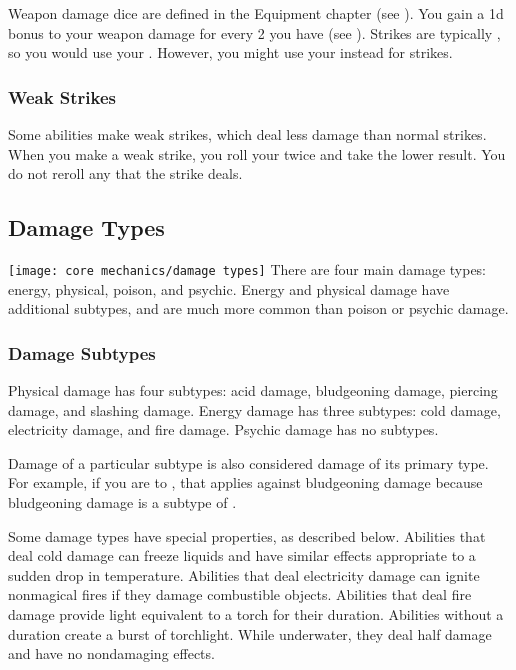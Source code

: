         Weapon damage dice are defined in the Equipment chapter (see ).
        You gain a \plus1d bonus to your weapon damage for every 2  you have (see ).
        Strikes are typically , so you would use your .
        However, you might use your  instead for \magical strikes.

        \subsubsection{Weak Strikes}
            Some abilities make weak strikes, which deal less damage than normal strikes.
            When you make a weak strike, you roll your  twice and take the lower result.
            You do not reroll any  that the strike deals.

    \subsection{Damage Types}\label{Damage Types}
        \texttt{[image: core mechanics/damage types]}
        There are four main damage types: energy, physical, poison, and psychic.
        Energy and physical damage have additional subtypes, and are much more common than poison or psychic damage.

        \subsubsection{Damage Subtypes}\label{Damage Subtypes}
            Physical damage has four subtypes: acid damage, bludgeoning damage, piercing damage, and slashing damage.
            Energy damage has three subtypes: cold damage, electricity damage, and fire damage.
            Psychic damage has no subtypes.

            Damage of a particular subtype is also considered damage of its primary type.
            For example, if you are  to , that applies against bludgeoning damage because bludgeoning damage is a subtype of .

            Some damage types have special properties, as described below.
             Abilities that deal cold damage can freeze liquids and have similar effects appropriate to a sudden drop in temperature.
             Abilities that deal electricity damage can ignite nonmagical fires if they damage combustible objects.
             Abilities that deal fire damage provide light equivalent to a torch for their duration.
            Abilities without a duration create a  burst of torchlight.
            While underwater, they deal half damage and have no nondamaging effects.


